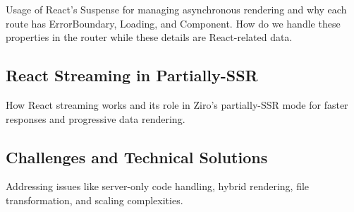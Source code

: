Usage of React's Suspense for managing asynchronous rendering and why each route has ErrorBoundary, Loading, and Component. How do we handle these properties in the router while these details are React-related data.

\subsection{React Streaming in Partially-SSR}

How React streaming works and its role in Ziro's partially-SSR mode for faster responses and progressive data rendering.


\subsection{Challenges and Technical Solutions}

Addressing issues like server-only code handling, hybrid rendering, file transformation, and scaling complexities.








\pagebreak
